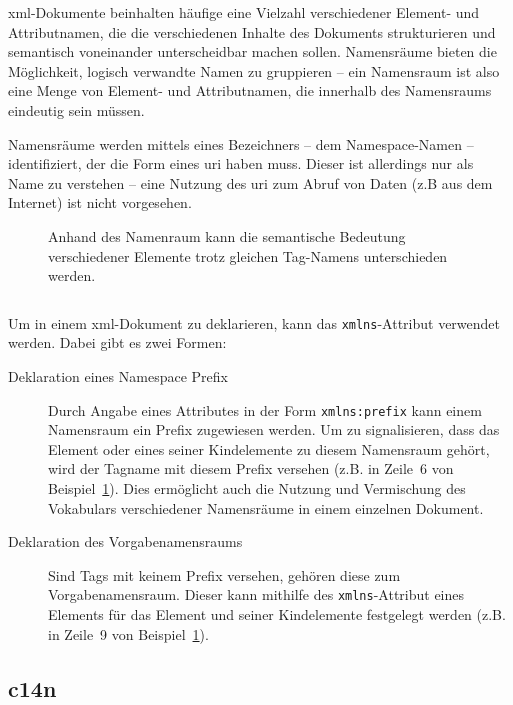 \acrshort{xml}-Dokumente beinhalten häufige eine Vielzahl verschiedener Element- und Attributnamen, die die verschiedenen Inhalte des Dokuments strukturieren und semantisch voneinander unterscheidbar machen sollen. Namensräume bieten die Möglichkeit, logisch verwandte Namen zu gruppieren -- ein Namensraum ist also eine Menge von Element- und Attributnamen, die innerhalb des Namensraums eindeutig sein müssen.

Namensräume werden mittels eines Bezeichners -- dem Namespace-Namen -- identifiziert, der die Form eines \gls{uri} haben muss. Dieser ist allerdings nur als Name zu verstehen -- eine Nutzung des \gls{uri} zum Abruf von Daten (z.B aus dem Internet) ist nicht vorgesehen.

\begin{figure}[h]
    \begin{example}
        \label{ex:xmlns}
        Anhand des Namenraum kann die semantische Bedeutung verschiedener Elemente trotz gleichen Tag-Namens unterschieden werden.
        \inputminted[firstline=2,firstnumber=1]{xml}{ex-xmlns.xml}
    \end{example}
\end{figure}

Um in einem \acrshort{xml}-Dokument zu deklarieren, kann das \texttt{xmlns}-Attribut verwendet werden. Dabei gibt es zwei Formen:

\begin{description}
    \item[Deklaration eines Namespace Prefix] Durch Angabe eines Attributes in der Form \texttt{xmlns:prefix} kann einem Namensraum ein Prefix zugewiesen werden. Um zu signalisieren, dass das Element oder eines seiner Kindelemente zu diesem Namensraum gehört, wird der Tagname mit diesem Prefix versehen (z.B. in Zeile~6 von Beispiel~\ref{ex:xmlns}). Dies ermöglicht auch die Nutzung und Vermischung des Vokabulars verschiedener Namensräume in einem einzelnen Dokument.
    \item[Deklaration des Vorgabenamensraums] Sind Tags mit keinem Prefix versehen, gehören diese zum Vorgabenamensraum. Dieser kann mithilfe des \texttt{xmlns}-Attribut eines Elements für das Element und seiner Kindelemente festgelegt werden (z.B. in Zeile~9 von Beispiel~\ref{ex:xmlns}).
\end{description}

\subsection{\acrfull{c14n}}
\label{sec:c14n}

